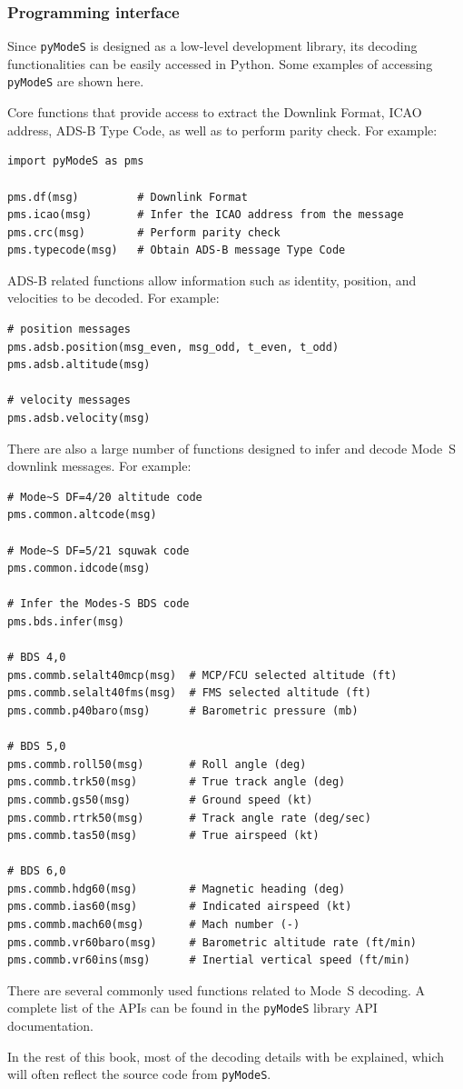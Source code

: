 \subsubsection{Programming interface}

Since \texttt{pyModeS} is designed as a low-level development library, its decoding functionalities can be easily accessed in Python. Some examples of accessing \texttt{pyModeS} are shown here.

Core functions that provide access to extract the Downlink Format, ICAO address, ADS-B Type Code, as well as to perform parity check. For example:

\begin{verbatim}
import pyModeS as pms

pms.df(msg)         # Downlink Format
pms.icao(msg)       # Infer the ICAO address from the message
pms.crc(msg)        # Perform parity check
pms.typecode(msg)   # Obtain ADS-B message Type Code
\end{verbatim}


ADS-B related functions allow information such as identity, position, and velocities to be decoded. For example:

\begin{verbatim}
# position messages
pms.adsb.position(msg_even, msg_odd, t_even, t_odd)
pms.adsb.altitude(msg)

# velocity messages
pms.adsb.velocity(msg)
\end{verbatim}

There are also a large number of functions designed to infer and decode Mode~S downlink messages. For example:

\begin{verbatim}
# Mode~S DF=4/20 altitude code
pms.common.altcode(msg)

# Mode~S DF=5/21 squwak code
pms.common.idcode(msg)

# Infer the Modes-S BDS code
pms.bds.infer(msg)

# BDS 4,0
pms.commb.selalt40mcp(msg)  # MCP/FCU selected altitude (ft)
pms.commb.selalt40fms(msg)  # FMS selected altitude (ft)
pms.commb.p40baro(msg)      # Barometric pressure (mb)

# BDS 5,0
pms.commb.roll50(msg)       # Roll angle (deg)
pms.commb.trk50(msg)        # True track angle (deg)
pms.commb.gs50(msg)         # Ground speed (kt)
pms.commb.rtrk50(msg)       # Track angle rate (deg/sec)
pms.commb.tas50(msg)        # True airspeed (kt)

# BDS 6,0
pms.commb.hdg60(msg)        # Magnetic heading (deg)
pms.commb.ias60(msg)        # Indicated airspeed (kt)
pms.commb.mach60(msg)       # Mach number (-)
pms.commb.vr60baro(msg)     # Barometric altitude rate (ft/min)
pms.commb.vr60ins(msg)      # Inertial vertical speed (ft/min)
\end{verbatim}

There are several commonly used functions related to Mode~S decoding. A complete list of the APIs can be found in the \texttt{pyModeS} library API documentation.

In the rest of this book, most of the decoding details with be explained, which will often reflect the source code from \texttt{pyModeS}.

